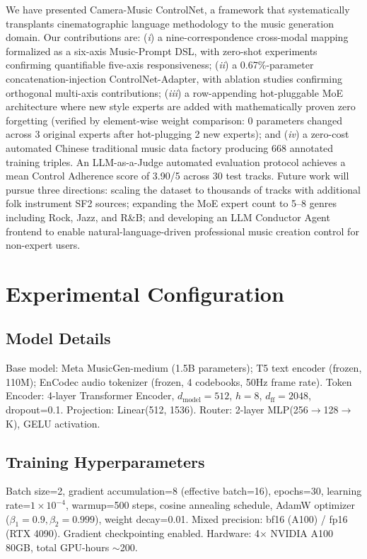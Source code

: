 \documentclass[11pt,twocolumn]{article}
\begin{document}
We have presented Camera-Music ControlNet, a framework that systematically transplants cinematographic language methodology to the music generation domain. Our contributions are: (\textit{i}) a nine-correspondence cross-modal mapping formalized as a six-axis Music-Prompt DSL, with zero-shot experiments confirming quantifiable five-axis responsiveness; (\textit{ii}) a 0.67\%-parameter concatenation-injection ControlNet-Adapter, with ablation studies confirming orthogonal multi-axis contributions; (\textit{iii}) a row-appending hot-pluggable MoE architecture where new style experts are added with mathematically proven zero forgetting (verified by element-wise weight comparison: 0 parameters changed across 3 original experts after hot-plugging 2 new experts); and (\textit{iv}) a zero-cost automated Chinese traditional music data factory producing 668 annotated training triples. An LLM-as-a-Judge automated evaluation protocol achieves a mean Control Adherence score of 3.90/5 across 30 test tracks. Future work will pursue three directions: scaling the dataset to thousands of tracks with additional folk instrument SF2 sources; expanding the MoE expert count to 5--8 genres including Rock, Jazz, and R\&B; and developing an LLM Conductor Agent frontend to enable natural-language-driven professional music creation control for non-expert users.


\newpage
\appendix
\section{Experimental Configuration}

\subsection{Model Details}
Base model: Meta MusicGen-medium (1.5B parameters); T5 text encoder (frozen, 110M); EnCodec audio tokenizer (frozen, 4 codebooks, 50Hz frame rate). Token Encoder: 4-layer Transformer Encoder, $d_{\text{model}}=512$, $h=8$, $d_{\text{ff}}=2048$, dropout=0.1. Projection: Linear(512, 1536). Router: 2-layer MLP(256$\rightarrow$128$\rightarrow$K), GELU activation.

\subsection{Training Hyperparameters}
Batch size=2, gradient accumulation=8 (effective batch=16), epochs=30, learning rate=$1\times10^{-4}$, warmup=500 steps, cosine annealing schedule, AdamW optimizer ($\beta_1=0.9,\beta_2=0.999$), weight decay=0.01. Mixed precision: bf16 (A100) / fp16 (RTX 4090). Gradient checkpointing enabled. Hardware: 4$\times$ NVIDIA A100 80GB, total GPU-hours $\sim$200.
\end{document}
